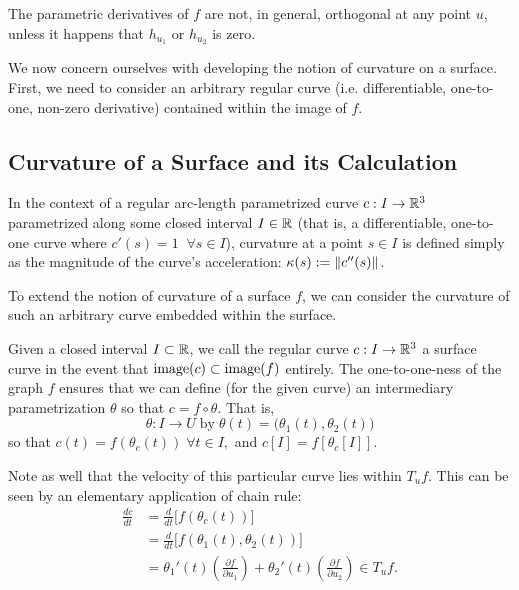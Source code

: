 	The parametric derivatives of $f$ are not, in general, orthogonal at any point $u$, unless it happens that $h_{u_1} $ or $h_{u_2}$ is zero.
	

We now concern ourselves with developing the notion of curvature on a surface. First, we need to consider an arbitrary regular curve (i.e. differentiable, one-to-one, non-zero derivative) contained within the image of $f$. 
  	
 

\subsection{Curvature of a Surface and its Calculation}
In the context of a regular arc-length parametrized curve $c: I \to \mathbb{R}^3$ parametrized along some closed interval $I\in \mathbb{R}$
 (that is, a differentiable, one-to-one curve where $c'(s) = 1 \;\; \forall s \in I$), curvature at a point $s \in I$ is defined simply as the magnitude of the curve's acceleration: $\kappa(s) := \Vert c''(s)\Vert$.
 
 To extend the notion of curvature of a surface $f$, we can consider the curvature of such an arbitrary curve embedded within the surface.
 
 \begin{defn} \label{def:curve-on-a-surface}
 	Given a closed interval $I \subset \mathbb{R}$, we call the regular curve
 	$c: I \to \mathbb{R}^3$ a surface curve in the event that $\mathrm{image}(c) \subset \mathrm{image}(f)$ entirely. The one-to-one-ness of the graph $f$ ensures that we can define (for the given curve) an intermediary parametrization $\theta$  so that
 	$ c = f \circ \theta $. That is,
 	\[
 	\theta : I \to U \; \textrm{by} \; \theta(t) = \big(\theta_1(t), \theta_2(t)\big)
 	\]
 	so that $c(t) = f(\theta_c(t)) \;\forall t\in I,$
 	and $c[I] = f\left[\theta_c[I]\right]$.
 \end{defn}
 Note as well that the velocity of this particular curve lies within $T_u f$. This
 can be seen by an elementary application of chain rule:
 \begin{align}
 \frac{d c}{dt} &= \frac{d}{dt}\big[ f(\theta_c(t))\big] \nonumber \\
 &= \frac{d}{dt}\big[f(\theta_1(t), \theta_2(t))\big] \nonumber \\
 &= \theta_1'(t)\left( \frac{\partial f}{\partial u_1} \right) + 
 \theta_2'(t)\left( \frac{\partial f}{\partial u_2} \right) \in T_uf.
 \end{align}
 
